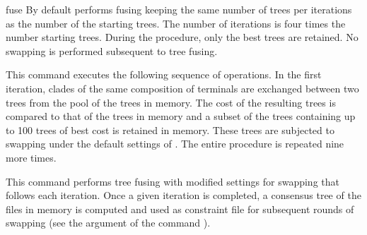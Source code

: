 \begin{command}{fuse}{}
        {By default \poy performs fusing keeping the same number of trees per
        iterations as the number of the starting trees. The number of iterations is
        four times the number starting trees. During the procedure, only the best
        trees are retained. No swapping is performed subsequent to tree fusing.}
        
    \begin{poyexamples}
	
            {This command executes the following sequence of operations. In the
            first iteration, clades of the same composition of terminals are exchanged
            between two trees from the pool of the trees in memory. The cost of the
            resulting trees is compared to that of the trees in memory and a subset of
            the trees containing up to 100 trees of best cost is retained in memory.
            These trees are subjected to swapping under the default settings of
            . The entire procedure is repeated nine more times.}
            
            {This command performs tree fusing  
            with modified settings for swapping that follows each iteration. Once
            a given iteration is completed, a consensus tree of the files in memory
            is computed and used as constraint file for subsequent rounds of swapping (see
            the argument  of the command
            ).}

     \end{poyexamples}
        
        \begin{poyalso}
    \end{poyalso}

\end{command}

